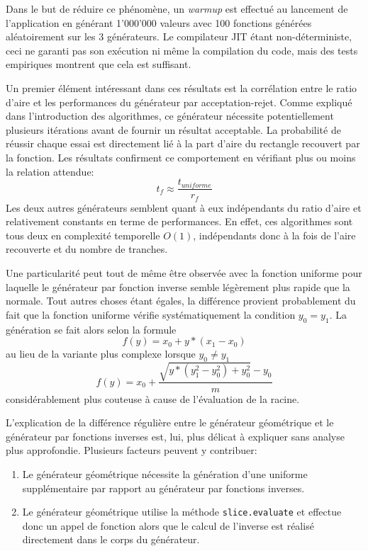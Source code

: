 \documentclass[a4paper,11pt]{article}
\begin{document}
Dans le but de réduire ce phénomène, un \emph{warmup} est effectué au lancement de l'application en générant 1'000'000 valeurs avec 100 fonctions générées aléatoirement sur les 3 générateurs. Le compilateur JIT étant non-déterministe, ceci ne garanti pas son exécution ni même la compilation du code, mais des tests empiriques montrent que cela est suffisant.

Un premier élément intéressant dans ces résultats est la corrélation entre le ratio d'aire et les performances du générateur par acceptation-rejet. Comme expliqué dans l'introduction des algorithmes, ce générateur nécessite potentiellement plusieurs itérations avant de fournir un résultat acceptable. La probabilité de réussir chaque essai est directement lié à la part d'aire du rectangle recouvert par la fonction. Les résultats confirment ce comportement en vérifiant plus ou moins la relation attendue:
\[
	t_f \approx \frac{t_{uniforme}}{r_f}
\]
Les deux autres générateurs semblent quant à eux indépendants du ratio d'aire et relativement constants en terme de performances. En effet, ces algorithmes sont tous deux en complexité temporelle $O(1)$, indépendants donc à la fois de l'aire recouverte et du nombre de tranches.

Une particularité peut tout de même être observée avec la fonction uniforme pour laquelle le générateur par fonction inverse semble légèrement plus rapide que la normale. Tout autres choses étant égales, la différence provient probablement du fait que la fonction uniforme vérifie systématiquement la condition $y_0=y_1$. La génération se fait alors selon la formule
\[ f(y) = x_0 + y * (x_1 - x_0) \]
au lieu de la variante plus complexe lorsque $y_0\ne y_1$
\[ f(y) = x_0 + \frac{\sqrt{y * (y_1^2 - y_0^2) + y_0^2} - y_0}{m} \]
considérablement plus couteuse à cause de l'évaluation de la racine.

L'explication de la différence régulière entre le générateur géométrique et le générateur par fonctions inverses est, lui, plus délicat à expliquer sans analyse plus approfondie. Plusieurs facteurs peuvent y contribuer:

\begin{enumerate}
	\item Le générateur géométrique nécessite la génération d'une uniforme supplémentaire par rapport au générateur par fonctions inverses.
	\item Le générateur géométrique utilise la méthode \texttt{slice.evaluate} et effectue donc un appel de fonction alors que le calcul de l'inverse est réalisé directement dans le corps du générateur.
\end{enumerate}
\end{document}
